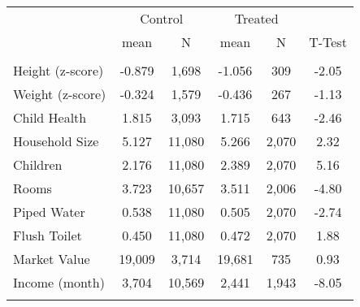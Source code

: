 
\begin{tabular}{lccccc}
 & \multicolumn{2}{c}{Control} & \multicolumn{2}{c}{Treated} &  \\
  & mean & N & mean & N & T-Test \\ \hline
 &  &  &  & &  \\
Height (z-score) & -0.879 & 1,698 & -1.056 & 309 & -2.05 \\
Weight (z-score) & -0.324 & 1,579 & -0.436 & 267 & -1.13 \\
Child Health & 1.815 & 3,093 & 1.715 & 643 & -2.46 \\
Household Size & 5.127 & 11,080 & 5.266 & 2,070 & 2.32  \\
Children & 2.176 & 11,080 & 2.389 & 2,070 & 5.16  \\
Rooms & 3.723 & 10,657 & 3.511 & 2,006 & -4.80 \\
Piped Water & 0.538 & 11,080 & 0.505 & 2,070 & -2.74 \\
Flush Toilet & 0.450 & 11,080 & 0.472 & 2,070 & 1.88 \\
Market Value & 19,009 & 3,714 & 19,681 & 735 & 0.93 \\
Income (month) & 3,704 & 10,569 & 2,441 & 1,943 & -8.05 \\
 &  &  &  &    \\ \hline
\end{tabular}

